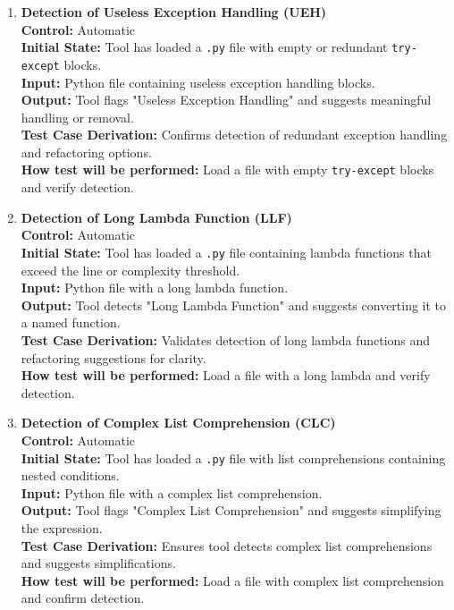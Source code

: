 \documentclass[12pt, titlepage]{article}
\begin{document}
\begin{enumerate}[label={\bf \textcolor{Maroon}{test-FR-CSD-\arabic*}}, wide=0pt, font=\itshape]
  \item \textbf{Detection of Useless Exception Handling (UEH)}\\[2mm]
    \textbf{Control:} Automatic \\
    \textbf{Initial State:} Tool has loaded a \texttt{.py} file with empty or redundant \texttt{try-except} blocks.\\
    \textbf{Input:} Python file containing useless exception handling blocks.\\
    \textbf{Output:} Tool flags "Useless Exception Handling" and suggests meaningful handling or removal.\\[2mm]
    \textbf{Test Case Derivation:} Confirms detection of redundant exception handling and refactoring options.\\[2mm]
    \textbf{How test will be performed:} Load a file with empty \texttt{try-except} blocks and verify detection.

  \item \textbf{Detection of Long Lambda Function (LLF)}\\[2mm]
    \textbf{Control:} Automatic \\    
    \textbf{Initial State:} Tool has loaded a \texttt{.py} file containing lambda functions that exceed the line or complexity threshold.     \\
    \textbf{Input:} Python file with a long lambda function.\\
    \textbf{Output:} Tool detects "Long Lambda Function" and suggests converting it to a named function.\\[2mm]
    \textbf{Test Case Derivation:} Validates detection of long lambda functions and refactoring suggestions for clarity.\\[2mm]
    \textbf{How test will be performed:} Load a file with a long lambda and verify detection.

  \item \textbf{Detection of Complex List Comprehension (CLC)}\\[2mm]
    \textbf{Control:} Automatic \\
    \textbf{Initial State:} Tool has loaded a \texttt{.py} file with list comprehensions containing nested conditions.\\
    \textbf{Input:} Python file with a complex list comprehension.\\
    \textbf{Output:} Tool flags "Complex List Comprehension" and suggests simplifying the expression.\\[2mm]
    \textbf{Test Case Derivation:} Ensures tool detects complex list comprehensions and suggests simplifications.\\[2mm]
    \textbf{How test will be performed:} Load a file with complex list comprehension and confirm detection.


\end{enumerate}
\end{document}
